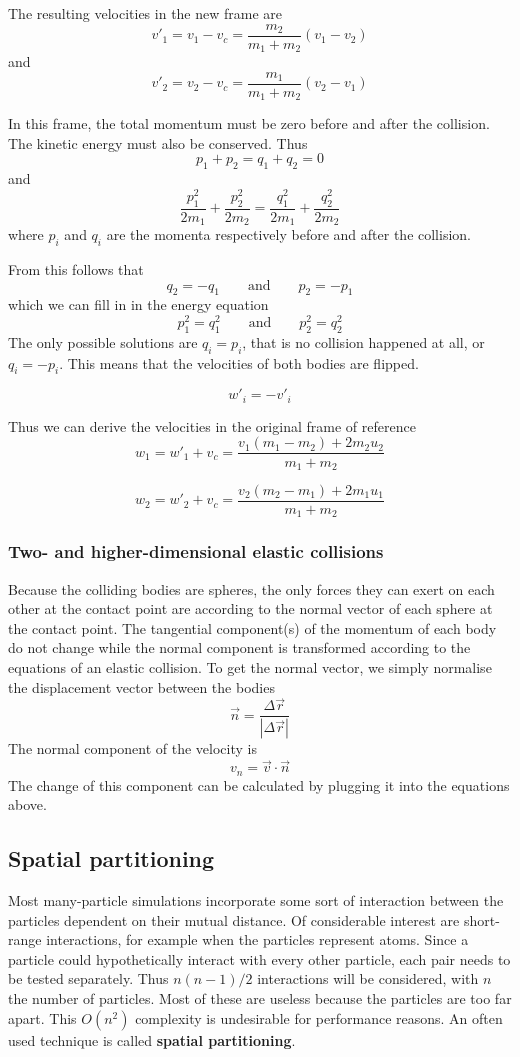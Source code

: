 The resulting velocities in the new frame are
$$
v'_1 = v_1 - v_c = \frac{m_2}{m_1+m_2}(v_1-v_2)
$$
and
$$
v'_2 = v_2 - v_c = \frac{m_1}{m_1+m_2}(v_2-v_1)
$$

In this frame, the total momentum must be zero before and after the collision.  
The kinetic energy must also be conserved.
Thus
$$
p_1 + p_2 = q_1 + q_2 = 0
$$
and
$$
\frac{p_1^2}{2m_1} + \frac{p_2^2}{2m_2} = \frac{q_1^2}{2m_1} + 
\frac{q_2^2}{2m_2}
$$
where $p_i$ and $q_i$ are the momenta respectively before and after the 
collision.

From this follows that
$$
q_2 = -q_1 \qquad \textrm{and} \qquad p_2 = -p_1
$$
which we can fill in in the energy equation
$$
p_1^2 = q_1^2 \qquad \textrm{and} \qquad p_2^2 = q_2^2
$$
The only possible solutions are $q_i = p_i$, that is no collision happened at 
all, or $q_i = -p_i$. This means that the velocities of both bodies are 
flipped.

$$
w'_i = -v'_i
$$

Thus we can derive the velocities in the original frame of reference
$$
w_1 = w'_1 + v_c = \frac{v_1(m_1-m_2) + 2m_2u_2}{m_1+m_2}
$$

$$
w_2 = w'_2 + v_c = \frac{v_2(m_2-m_1) + 2m_1u_1}{m_1+m_2}
$$

\subsubsection{Two- and higher-dimensional elastic collisions}
Because the colliding bodies are spheres, the only forces they can exert on 
each other at the contact point are according to the normal vector of each 
sphere at the contact point. The tangential component(s) of the momentum of 
each body do not change while the normal component is transformed according to 
the equations of an elastic collision. To get the normal vector, we simply 
normalise the displacement vector between the bodies
$$
\vec{n} = \frac{\Delta\vec{r}}{|\Delta\vec{r}|}
$$
The normal component of the velocity is
$$
v_n = \vec{v} \cdot \vec{n}
$$
The change of this component can be calculated by plugging it into the 
equations above.

\subsection{Spatial partitioning}

Most many-particle simulations incorporate some sort of interaction between the 
particles dependent on their mutual distance. Of considerable interest are 
short-range interactions, for example when the particles represent atoms. Since 
a particle could hypothetically interact with every other particle, each pair 
needs to be tested separately. Thus $n(n-1)/2$ interactions will be considered, 
with $n$ the number of particles. Most of these are useless because the 
particles are too far apart. This $O(n^2)$ complexity is undesirable for 
performance reasons. An often used technique is called \textbf{spatial 
partitioning}.

